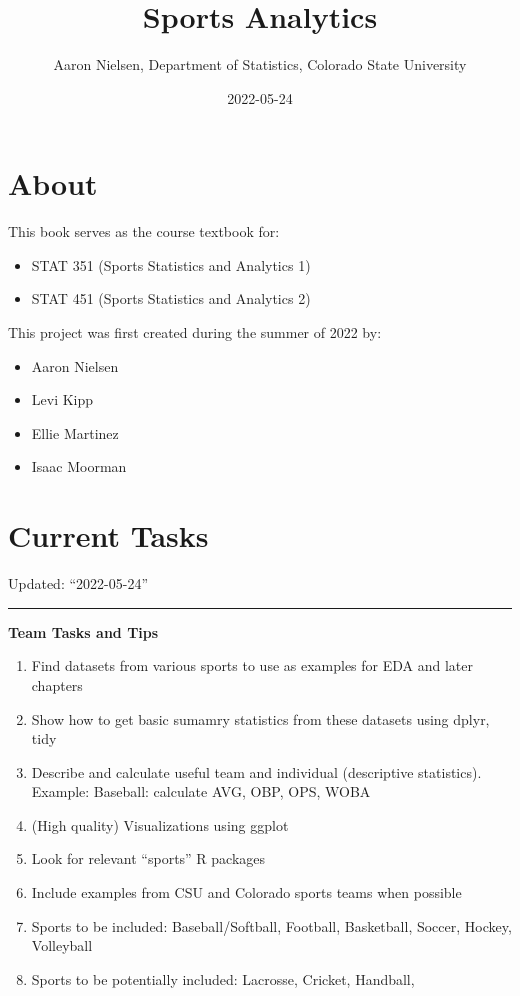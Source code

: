 \documentclass[
]{book}
\title{Sports Analytics}
\author{Aaron Nielsen, Department of Statistics, Colorado State University}
\date{2022-05-24}
\providecommand{\tightlist}{%
  \setlength{\itemsep}{0pt}\setlength{\parskip}{0pt}}
\theoremstyle{definition}
\theoremstyle{definition}
\theoremstyle{definition}
\theoremstyle{definition}
\theoremstyle{remark}
\begin{document}
\maketitle

{
\setcounter{tocdepth}{1}
\tableofcontents
}
\hypertarget{about}{%
\chapter*{About}\label{about}}

This book serves as the course textbook for:

\begin{itemize}
\item
  STAT 351 (Sports Statistics and Analytics 1)
\item
  STAT 451 (Sports Statistics and Analytics 2)
\end{itemize}

This project was first created during the summer of 2022 by:

\begin{itemize}
\item
  Aaron Nielsen
\item
  Levi Kipp
\item
  Ellie Martinez
\item
  Isaac Moorman
\end{itemize}

\hypertarget{current-tasks}{%
\chapter*{Current Tasks}\label{current-tasks}}

Updated: ``2022-05-24''

\begin{center}\rule{0.5\linewidth}{0.5pt}\end{center}

\textbf{Team Tasks and Tips}

\begin{enumerate}
\def\labelenumi{\arabic{enumi}.}
\tightlist
\item
  Find datasets from various sports to use as examples for EDA and later chapters
\item
  Show how to get basic sumamry statistics from these datasets using dplyr, tidy
\item
  Describe and calculate useful team and individual (descriptive statistics). Example: Baseball: calculate AVG, OBP, OPS, WOBA
\item
  (High quality) Visualizations using ggplot
\item
  Look for relevant ``sports'' R packages
\item
  Include examples from CSU and Colorado sports teams when possible
\item
  Sports to be included: Baseball/Softball, Football, Basketball, Soccer, Hockey, Volleyball
\item
  Sports to be potentially included: Lacrosse, Cricket, Handball,
\end{enumerate}
\end{document}
